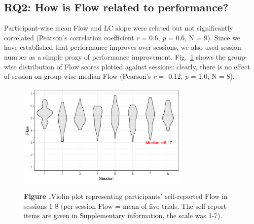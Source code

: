 \documentclass{frontierstyle/frontiersSCNS}
\newcommand{\nicewidth}{0.75\textwidth}
\begin{document}
\subsection{RQ2: How is Flow related to performance?}

Participant-wise mean Flow and LC slope were related but not significantly correlated (Pearson's correlation coefficient {\it r} = 0.6, {\it p} = 0.6, N = 9). %
Since we have established that performance improves over sessions, we also used session number as a simple proxy of performance improvement. Fig.~\ref{fig:FlowVssn} shows the group-wise distribution of Flow scores plotted against sessions: clearly, there is no effect of session on group-wise median Flow (Pearson's {\it r} = -0.12, {\it p} = 1.0, N = 8).%

\begin{figure}[!b]
\begin{center}
	\includegraphics[width=\nicewidth]{session_fss2}
\end{center}
	\textbf{\label{fig:FlowVssn} Figure .}{Violin plot representing participants' self-reported Flow in sessions 1-8 (per-session Flow = mean of five trials. The self-report items are given in Supplementary information, the scale was 1-7).}
\end{figure}
\end{document}
